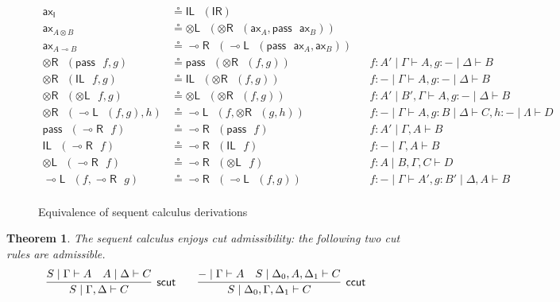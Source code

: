 \documentclass[submission,copyright,creativecommons]{eptcs}
\newtheorem{theorem}{Theorem}[section]
\theoremstyle{definition}
\newcommand{\tl}{\otimes \mathsf{L}}
\newcommand{\tr}{\otimes \mathsf{R}}
\newcommand{\lright}{{\multimap}\mathsf{R}}
\newcommand{\lleft}{{\multimap}\mathsf{L}}
\newcommand{\pass}{\mathsf{pass}}
\newcommand{\unitl}{\mathsf{IL}}
\newcommand{\unitr}{\mathsf{IR}}
\newcommand{\ax}{\mathsf{ax}}
\newcommand{\ot}{\otimes}
\newcommand{\lolli}{\multimap}
\newcommand{\I}{\mathsf{I}}
\newcommand{\niccolo}[1]{{\color{red}\textbf{Niccol{\`o}: }#1}}
\begin{document}
\begin{figure}[t!]\small
\begin{align*}
  \ax_{\I} &\circeq \unitl \text{ } (\unitr)
  \\
  \ax_{A \ot B} &\circeq \tl \text{ } (\tr \text{ } (\ax_{A} , \pass \text{ } \ax_{B}))
  \\
  \ax_{A \lolli B} &\circeq \lright \text{ } (\lleft \text{ } (\pass \text{ } \ax_{A}, \ax_{B} ))
  \\
  \tr \text{ } (\pass \text{ } f, g) &\circeq \pass \text{ } (\tr \text{ } (f, g)) &&f : A' \mid \Gamma \vdash A, g : - \mid \Delta \vdash B
  \\
  \tr \text{ } (\unitl \text{ } f, g) &\circeq \unitl \text{ } (\tr \text{ } (f , g)) &&f : - \mid \Gamma \vdash A , g : - \mid \Delta \vdash B
  \\
  \tr \text{ } (\tl \text{ } f, g) &\circeq \tl \text{ } (\tr \text{ } (f , g)) &&f : A' \mid B' , \Gamma \vdash A , g : - \mid \Delta \vdash B
  \\
  \tr \text{ } (\lleft \text{ } (f , g), h) & \circeq \lleft \text{ } (f, \tr \text{ } (g, h)) &&f: - \mid \Gamma \vdash A, g : B \mid \Delta \vdash C, h : - \mid \Lambda \vdash D
  \\
  \pass \text{ } (\lright \text{ } f) &\circeq \lright \text{ } (\pass \text{ } f) &&f : A' \mid \Gamma , A \vdash B
  \\
  \unitl \text{ } (\lright \text{ } f) &\circeq \lright \text{ } (\unitl \text{ } f) &&f : - \mid \Gamma , A \vdash B
  \\
  \tl \text{ } (\lright \text{ } f) &\circeq \lright \text{ } (\tl \text{ } f) &&f : A \mid B , \Gamma , C \vdash D
  \\
  \lleft \text{ } (f, \lright \text{ } g) &\circeq \lright \text{ } (\lleft \text{ } (f, g)) &&f : - \mid \Gamma \vdash A', g : B' \mid \Delta , A \vdash B
  \\
\end{align*}
\vspace{-1.5cm}
\caption{Equivalence of sequent calculus derivations}
\label{fig:circeq}
\end{figure}
\begin{theorem}
The sequent calculus enjoys cut admissibility: the following two cut rules are admissible.
  \begin{displaymath}
    \infer[\mathsf{scut}]{S \mid \Gamma , \Delta \vdash C}{
      S \mid \Gamma \vdash A
      &
      A \mid \Delta \vdash C
    }
    \qquad
    \infer[\mathsf{ccut}]{S \mid \Delta_0 , \Gamma , \Delta_1 \vdash C}{
      - \mid \Gamma \vdash A
      &
      S \mid \Delta_0 , A , \Delta_1 \vdash C
    }
  \end{displaymath}
\end{theorem}
\end{document}
